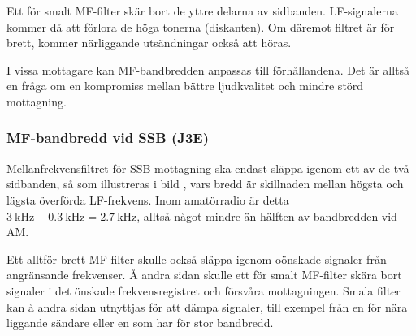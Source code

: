 Ett för smalt MF-filter skär bort de yttre delarna av sidbanden.
LF-signalerna kommer då att förlora de höga tonerna (diskanten).
Om däremot filtret är för brett, kommer närliggande utsändningar också att
höras.

I vissa mottagare kan MF-bandbredden anpassas till förhållandena.
Det är alltså en fråga om en kompromiss mellan bättre ljudkvalitet och
mindre störd mottagning.

\subsubsection{MF-bandbredd vid SSB (J3E)}


Mellanfrekvensfiltret för SSB-mottagning ska endast släppa igenom
ett av de två sidbanden, så som illustreras i bild ,
vars bredd är skillnaden mellan högsta och lägsta överförda LF-frekvens.
Inom amatörradio är detta \(\SI{3}{\kilo\hertz} - \SI{0,3}{\kilo\hertz} =
\SI{2,7}{\kilo\hertz}\), alltså något mindre än hälften av bandbredden vid AM.

Ett alltför brett MF-filter skulle också släppa igenom oönskade
signaler från angränsande frekvenser.
Å andra sidan skulle ett för smalt MF-filter skära bort signaler i det
önskade frekvensregistret och försvåra mottagningen.
Smala filter kan å andra sidan utnyttjas för att dämpa signaler, till exempel från
en för nära liggande sändare eller en som har för stor bandbredd.

